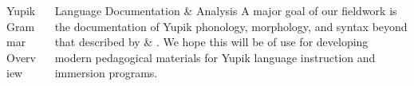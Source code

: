 \documentclass[usenames,dvipsnames]{beamer}
\begin{document}
\begin{frame}[fragile]
\begin{columns}[T]
\begin{column}{0.3\textwidth}
\begin{block}{Yupik Grammar Overview}
\begin{itemize}
    \vspace{18pt}
\end{itemize}
\vspace*{9mm}
\end{block}
\end{column}

\begin{column}{0.3\textwidth}
\begin{block}{Language Documentation \& Analysis}
%
A major goal of our fieldwork is the documentation of Yupik phonology, morphology, and syntax beyond that described by \citet{Krauss:1975} \& \citet{Jacobson:2001}.
%
We hope this will be of use for developing modern pedagogical materials for Yupik language instruction and immersion programs.

\end{block}


\end{column}
\end{columns}
\end{frame}
\end{document}
